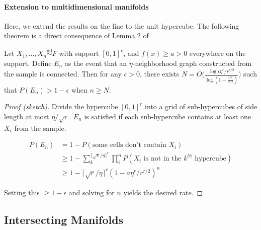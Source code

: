 \documentclass[12pt]{article}
\begin{document}
\hypertarget{extension-to-multidimensional-manifolds}{%
\paragraph{Extension to multidimensional
manifolds}\label{extension-to-multidimensional-manifolds}}

Here, we extend the results on the line to the unit hypercube. The
following theorem is a direct consequence of Lemma 2 of
\citet{trosset2020rehabilitating}.

\begin{theorem}
\label{thm:multidim}
Let $X_1, ..., X_n \stackrel{\mathrm{iid}}{\sim}F$ with support $[0, 1]^r$, and $f(x) \geq a > 0$ everywhere on the support. 
Define $E_n$ as the event that an $\eta$-neighborhood graph constructed from the sample is connected. 
Then for any $\epsilon > 0$, there exists $N = O \bigg( \frac{\log \epsilon \eta^r / r^{r/2}}{\log (1 - \frac{a \eta^r}{r^{r / 2}})} \bigg)$ such that $P(E_n) > 1 - \epsilon$ when $n \geq N$.
\end{theorem}

\begin{proof}[Proof (sketch)]
Divide the hypercube $[0, 1]^r$ into a grid of sub-hypercubes of side length at most $\eta / \sqrt{r}$. 
$E_n$ is satisfied if each sub-hypercube contains at least one $X_i$ from the sample. 

$$
\begin{aligned}
P(E_n) & = 1 - P(\text{some cells don't contain } X_i) \\
& \geq 1 - \sum_k^{\lceil \sqrt{r} / \eta \rceil^r} \prod_i^n P(X_i \text{ is not in the } k^{th} \text{ hypercube}) \\
& \geq 1 - \lceil \sqrt{r} / \eta \rceil^r (1 - a \eta^r / r^{r/2})^n
\end{aligned}
$$

Setting this $\geq 1 - \epsilon$ and solving for $n$ yields the desired rate. 
\end{proof}

\hypertarget{intersecting-manifolds}{%
\subsection{Intersecting Manifolds}\label{intersecting-manifolds}}
\end{document}

